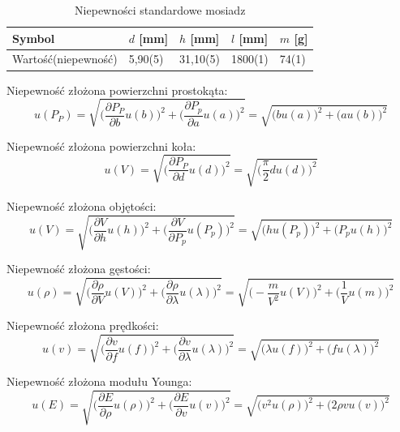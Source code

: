 \documentclass [a4paper,11pt]{article}
\begin{document}
		\begin{table}[h!]
			\centering
			\caption{Niepewności standardowe mosiadz}
			\label{tab:nsmosiadz}
			\begin{tabular}{l|l|l|l|l}
					Symbol & \textit{$d$} [mm]  & \textit{$h$} [mm]   & \textit{$l$} [mm]     & \textit{$m$} [g]   \\ \hline
				Wartość(niepewność)	& 5,90(5)      & 31,10(5) & 1800(1) & 74(1) \\
			\end{tabular}
		\end{table}
	Niepewność złożona powierzchni prostokąta:
		\begin{equation}
		u(P_P)=\sqrt{\bigg(\frac{\partial P_P}{\partial b}u(b)\bigg)^2 + \bigg(\frac{\partial P_p}{\partial a}u(a)\bigg)^2} = \sqrt{\bigg(bu(a)\bigg)^2+\bigg(au(b) \bigg)^2}
			\end{equation}
			
	Niepewność złożona powierzchni koła:
		\begin{equation}
		u(V)=\sqrt{\bigg(\frac{\partial P_P}{\partial d}u(d)\bigg)^2} = \sqrt{\bigg(\frac{\pi}{2}du(d)\bigg)^2}
		\end{equation}
		
	Niepewność złożona objętości:
	\begin{equation}
	u(V)=\sqrt{\bigg(\frac{\partial V}{\partial h}u(h)\bigg)^2 + \bigg(\frac{\partial V}{\partial P_p}u(P_p)\bigg)^2} = \sqrt{\bigg(hu(P_p)\bigg)^2+\bigg(P_pu(h) \bigg)^2}
	\end{equation}
	
	Niepewność złożona gęstości:
	\begin{equation}
	u(\rho)=\sqrt{\bigg(\frac{\partial \rho}{\partial V}u(V)\bigg)^2+\bigg(\frac{\partial \rho}{\partial \lambda}u(\lambda)\bigg)^2}=\sqrt{\bigg(-\frac{m}{V^2}u(V)\bigg)^2+\bigg(\frac{1}{V}u(m) \bigg)^2}
	\end{equation}
	
	Niepewność złożona prędkości:
	\begin{equation}
	u(v)=\sqrt{\bigg(\frac{\partial v}{\partial f}u(f)\bigg)^2+\bigg(\frac{\partial v}{\partial \lambda}u(\lambda)\bigg)^2}=\sqrt{\bigg(\lambda u(f)\bigg)^2+\bigg(f u(\lambda)\bigg)^2}
	\end{equation}
	
	Niepewność złożona modułu Younga:
	\begin{equation}
			 u(E)=\sqrt{\bigg(\frac{\partial E}{\partial \rho}u(\rho)\bigg)^2+\bigg(\frac{\partial E}{\partial v}u(v)\bigg)^2} =
	\sqrt{\bigg(v^2 u(\rho)\bigg)^2+\bigg(2 \rho v u(v)\bigg)^2}
	\end{equation}
\end{document}
